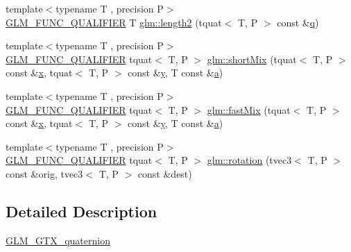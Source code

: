 \begin{DoxyCompactItemize}
{\footnotesize template$<$typename T , precision P$>$ }\\\mbox{\hyperlink{setup_8hpp_a33fdea6f91c5f834105f7415e2a64407}{G\+L\+M\+\_\+\+F\+U\+N\+C\+\_\+\+Q\+U\+A\+L\+I\+F\+I\+ER}} T \mbox{\hyperlink{group__gtx__quaternion_ga02b45352c7ac345cabc9e877314acda6}{glm\+::length2}} (tquat$<$ T, P $>$ const \&\mbox{\hyperlink{glad_8h_a514729309336df22bcc8eda979d6ced4}{q}})
\item 
{\footnotesize template$<$typename T , precision P$>$ }\\\mbox{\hyperlink{setup_8hpp_a33fdea6f91c5f834105f7415e2a64407}{G\+L\+M\+\_\+\+F\+U\+N\+C\+\_\+\+Q\+U\+A\+L\+I\+F\+I\+ER}} tquat$<$ T, P $>$ \mbox{\hyperlink{group__gtx__quaternion_ga3534443de2a1a806f386976546cddc81}{glm\+::short\+Mix}} (tquat$<$ T, P $>$ const \&\mbox{\hyperlink{glad_8h_a92d0386e5c19fb81ea88c9f99644ab1d}{x}}, tquat$<$ T, P $>$ const \&\mbox{\hyperlink{glad_8h_a66ddd433d2cacfe27f5906b7e86faeed}{y}}, T const \&\mbox{\hyperlink{glad_8h_ac8729153468b5dcf13f971b21d84d4e5}{a}})
\item 
{\footnotesize template$<$typename T , precision P$>$ }\\\mbox{\hyperlink{setup_8hpp_a33fdea6f91c5f834105f7415e2a64407}{G\+L\+M\+\_\+\+F\+U\+N\+C\+\_\+\+Q\+U\+A\+L\+I\+F\+I\+ER}} tquat$<$ T, P $>$ \mbox{\hyperlink{group__gtx__quaternion_gac11bf550f17d1da14423595a27575084}{glm\+::fast\+Mix}} (tquat$<$ T, P $>$ const \&\mbox{\hyperlink{glad_8h_a92d0386e5c19fb81ea88c9f99644ab1d}{x}}, tquat$<$ T, P $>$ const \&\mbox{\hyperlink{glad_8h_a66ddd433d2cacfe27f5906b7e86faeed}{y}}, T const \&\mbox{\hyperlink{glad_8h_ac8729153468b5dcf13f971b21d84d4e5}{a}})
\item 
{\footnotesize template$<$typename T , precision P$>$ }\\\mbox{\hyperlink{setup_8hpp_a33fdea6f91c5f834105f7415e2a64407}{G\+L\+M\+\_\+\+F\+U\+N\+C\+\_\+\+Q\+U\+A\+L\+I\+F\+I\+ER}} tquat$<$ T, P $>$ \mbox{\hyperlink{group__gtx__quaternion_gac4856d356c5c97cec74e9b672ea89240}{glm\+::rotation}} (tvec3$<$ T, P $>$ const \&orig, tvec3$<$ T, P $>$ const \&dest)
\end{DoxyCompactItemize}


\subsection{Detailed Description}
\mbox{\hyperlink{group__gtx__quaternion}{G\+L\+M\+\_\+\+G\+T\+X\+\_\+quaternion}} 